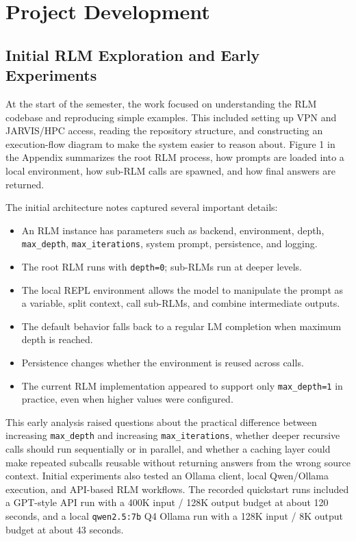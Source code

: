 \documentclass[10pt,a4paper]{article}
\begin{document}
\section{Project Development}

\subsection{Initial RLM Exploration and Early Experiments}

At the start of the semester, the work focused on understanding the RLM codebase and reproducing simple examples. This included setting up VPN and JARVIS/HPC access, reading the repository structure, and constructing an execution-flow diagram to make the system easier to reason about. Figure 1 in the Appendix summarizes the root RLM process, how prompts are loaded into a local environment, how sub-RLM calls are spawned, and how final answers are returned.

The initial architecture notes captured several important details:

\begin{itemize}
\item An RLM instance has parameters such as backend, environment, depth, \texttt{max\_depth}, \texttt{max\_iterations}, system prompt, persistence, and logging.
\item The root RLM runs with \texttt{depth=0}; sub-RLMs run at deeper levels.
\item The local REPL environment allows the model to manipulate the prompt as a variable, split context, call sub-RLMs, and combine intermediate outputs.
\item The default behavior falls back to a regular LM completion when maximum depth is reached.
\item Persistence changes whether the environment is reused across calls.
\item The current RLM implementation appeared to support only \texttt{max\_depth=1} in practice, even when higher values were configured.
\end{itemize}

This early analysis raised questions about the practical difference between increasing \texttt{max\_depth} and increasing \texttt{max\_iterations}, whether deeper recursive calls should run sequentially or in parallel, and whether a caching layer could make repeated subcalls reusable without returning answers from the wrong source context. Initial experiments also tested an Ollama client, local Qwen/Ollama execution, and API-based RLM workflows. The recorded quickstart runs included a GPT-style API run with a 400K input / 128K output budget at about 120 seconds, and a local \texttt{qwen2.5:7b} Q4 Ollama run with a 128K input / 8K output budget at about 43 seconds.
\end{document}
